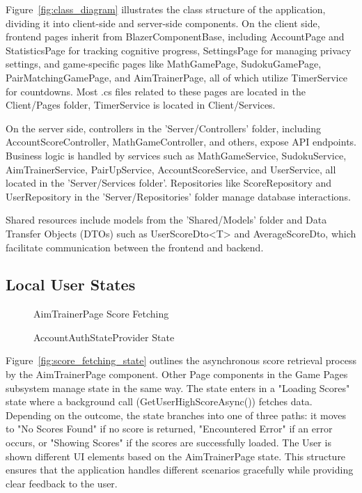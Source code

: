 \documentclass[11pt,a4paper]{article}
\newcommand{\inputdiagram}[1]{}
\newcommand{\textwidthdiagram}[2][1]{%
  \resizebox{#1\textwidth}{!}{\inputdiagram{#2}}%
}
\begin{document}
Figure~\ref{fig:class_diagram} illustrates the class structure of the application, dividing it into client-side and server-side components. On the client side, frontend pages inherit from BlazerComponentBase, including AccountPage and StatisticsPage for tracking cognitive progress, SettingsPage for managing privacy settings, and game-specific pages like MathGamePage, SudokuGamePage, PairMatchingGamePage, and AimTrainerPage, all of which utilize TimerService for countdowns. Most .cs files related to these pages are located in the Client/Pages folder, TimerService is located in Client/Services.

On the server side, controllers in the 'Server/Controllers' folder, including AccountScoreController, MathGameController, and others, expose API endpoints. Business logic is handled by services such as MathGameService, SudokuService, AimTrainerService, PairUpService, AccountScoreService, and UserService, all located in the 'Server/Services folder'. Repositories like ScoreRepository and UserRepository in the 'Server/Repositories' folder manage database interactions.

Shared resources include models from the 'Shared/Models' folder and Data Transfer Objects (DTOs) such as UserScoreDto<T> and AverageScoreDto, which facilitate communication between the frontend and backend.

\subsection{Local User States}
\begin{figure}[H]
    \centering
    \begin{minipage}[b]{0.59\textwidth}
        \centering
        \textwidthdiagram{score_fetching_state.tex}
        \caption{AimTrainerPage Score Fetching}
        \label{fig:score_fetching_state}
    \end{minipage}
    \hfil
    \begin{minipage}[b]{0.4\textwidth}
        \centering
        \textwidthdiagram{user_authentication_state.tex}
        \caption{AccountAuthStateProvider State}
        \label{fig:user_authentication_state}
    \end{minipage}
\end{figure}

Figure~\ref{fig:score_fetching_state} outlines the asynchronous score
retrieval process by the AimTrainerPage component. Other Page components in
the Game Pages subsystem manage state in the same way. The state enters in
a "Loading Scores" state where a background call (GetUserHighScoreAsync())
fetches data. Depending on the outcome, the state branches into one of three
paths: it moves to "No Scores Found" if no score is returned, "Encountered
Error" if an error occurs, or "Showing Scores" if the scores are successfully
loaded. The User is shown different UI elements based on the AimTrainerPage
state. This structure ensures that the application handles different scenarios
gracefully while providing clear feedback to the user.
\end{document}
